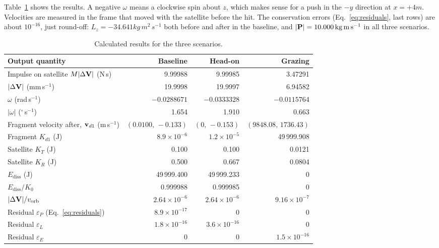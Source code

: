 Table~\ref{tab:results} shows the results. A negative $\omega$ means a
clockwise spin about $z$, which makes sense for a push in the $-y$
direction at $x=+4\unit{m}$. Velocities are measured in the frame that
moved with the satellite before the hit. The conservation errors
(Eq.~\eqref{eq:residuals}, last rows) are about $10^{-16}$, just round-off: $L_z=-34.641\unit{kg\,m^2\,s^{-1}}$
both before and after in the baseline, and $|\mathbf{P}|=10.000\,\mathrm{kg\,m\,s^{-1}}$
in all three scenarios.

\begin{table}[H]
  \centering\footnotesize
  \begin{tabular}{@{}lrrr@{}}
    \toprule
    Output quantity & Baseline & Head-on & Grazing \\
    \midrule
    Impulse on satellite $M|\Delta\mathbf{V}|$ (N\,s) & 9.99988 & 9.99985 & 3.47291 \\
    $|\Delta\mathbf{V}|$ (mm\,s$^{-1}$) & 19.9998 & 19.9997 & 6.94582 \\
    $\omega$ (rad\,s$^{-1}$) & $-0.0288671$ & $-0.0333328$ & $-0.0115764$ \\
    $|\omega|$ ($^\circ$\,s$^{-1}$) & 1.654 & 1.910 & 0.663 \\
    Fragment velocity after, $\mathbf{v}_{d1}$ (m\,s$^{-1}$) & $(0.0100,\,-0.133)$ & $(0,\,-0.153)$ & $(9848.08,\,1736.43)$ \\
    Fragment $K_{d1}$ (J) & $8.9\times10^{-6}$ & $1.2\times10^{-5}$ & 49\,999.908 \\
    Satellite $K_T$ (J) & 0.100 & 0.100 & 0.0121 \\
    Satellite $K_R$ (J) & 0.500 & 0.667 & 0.0804 \\
    $E_{\mathrm{diss}}$ (J) & 49\,999.400 & 49\,999.233 & 0 \\
    $E_{\mathrm{diss}}/K_0$ & 0.999988 & 0.999985 & 0 \\
    $|\Delta\mathbf{V}|/v_{\mathrm{orb}}$ & $2.64\times10^{-6}$ & $2.64\times10^{-6}$ & $9.16\times10^{-7}$ \\
    \midrule
    Residual $\varepsilon_P$ (Eq.~\eqref{eq:residuals}) & $8.9\times10^{-17}$ & 0 & 0 \\
    Residual $\varepsilon_L$ & $1.8\times10^{-16}$ & $3.6\times10^{-16}$ & 0 \\
    Residual $\varepsilon_E$ & 0 & 0 & $1.5\times10^{-16}$ \\
    \bottomrule
  \end{tabular}
  \caption{Calculated results for the three scenarios.}
  \label{tab:results}
\end{table}


